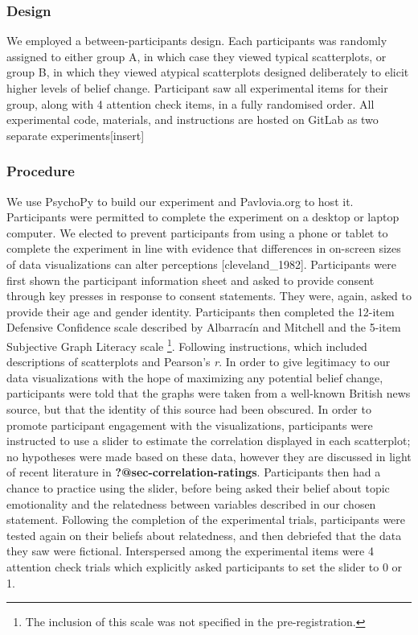 \documentclass[manuscript,screen,review]{acmart}
\begin{document}
\subsubsection{Design}\label{design}

We employed a between-participants design. Each participants was
randomly assigned to either group A, in which case they viewed typical
scatterplots, or group B, in which they viewed atypical scatterplots
designed deliberately to elicit higher levels of belief change.
Participant saw all experimental items for their group, along with 4
attention check items, in a fully randomised order. All experimental
code, materials, and instructions are hosted on GitLab as two separate
experiments{[}insert{]}

\subsubsection{Procedure}\label{procedure}

We use PsychoPy \citep{pierce_2019} to build our experiment and
Pavlovia.org to host it. Participants were permitted to complete the
experiment on a desktop or laptop computer. We elected to prevent
participants from using a phone or tablet to complete the experiment in
line with evidence that differences in on-screen sizes of data
visualizations can alter perceptions {[}cleveland\_1982{]}. Participants
were first shown the participant information sheet and asked to provide
consent through key presses in response to consent statements. They
were, again, asked to provide their age and gender identity.
Participants then completed the 12-item Defensive Confidence scale
described by Albarracín and Mitchell \citep{albarracin_2004} and the
5-item Subjective Graph Literacy scale \citep{garcia_2016}\footnote{The
  inclusion of this scale was not specified in the pre-registration.}.
Following instructions, which included descriptions of scatterplots and
Pearson's \emph{r}. In order to give legitimacy to our data
visualizations with the hope of maximizing any potential belief change,
participants were told that the graphs were taken from a well-known
British news source, but that the identity of this source had been
obscured. In order to promote participant engagement with the
visualizations, participants were instructed to use a slider to estimate
the correlation displayed in each scatterplot; no hypotheses were made
based on these data, however they are discussed in light of recent
literature in \textbf{?@sec-correlation-ratings}. Participants then had
a chance to practice using the slider, before being asked their belief
about topic emotionality and the relatedness between variables described
in our chosen statement. Following the completion of the experimental
trials, participants were tested again on their beliefs about
relatedness, and then debriefed that the data they saw were fictional.
Interspersed among the experimental items were 4 attention check trials
which explicitly asked participants to set the slider to 0 or 1.
\end{document}
